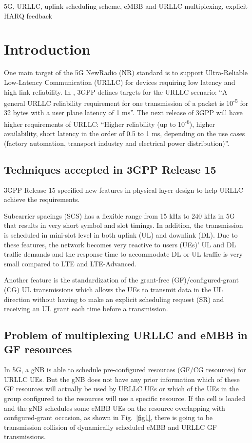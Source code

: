 \documentclass[conference]{IEEEtran}
\begin{document}
\begin{IEEEkeywords}
5G, URLLC, uplink scheduling scheme, eMBB and URLLC multiplexing, explicit HARQ feedback
\end{IEEEkeywords}

\section{Introduction} \label{I}
One main target of the 5G NewRadio (NR) standard is to support Ultra-Reliable Low-Latency Communication (URLLC) for devices requiring low latency and high link reliability. In \cite{b6}, 3GPP defines targets for the URLLC scenario: ``A general URLLC reliability requirement for one transmission of a packet is 10\textsuperscript{-5} for 32 bytes with a user plane latency of 1 ms''. The next release of 3GPP will have higher requirements of URLLC: ``Higher reliability (up to 10\textsuperscript{-6}), higher availability, short latency in the order of 0.5 to 1 ms, depending on the use cases (factory automation, transport industry and electrical power distribution)''\cite{b8}.

\subsection{Techniques accepted in 3GPP Release 15}\label{IAA}
3GPP Release 15 specified new features in physical layer design to help URLLC achieve the requirements.

Subcarrier spacings (SCS) has a flexible range from 15 kHz to 240 kHz in 5G that results in very short symbol and slot timings\cite{ad2}. In addition, the transmission is scheduled in  mini-slot level in both uplink (UL) and downlink (DL)\cite{ad3}. Due to these features, the network becomes very reactive to users (UEs)' UL and DL traffic demands and the response time to accommodate DL or UL traffic is very small compared to LTE and LTE-Advanced.

Another feature is the standardization of the grant-free (GF)/configured-grant (CG) UL transmissions which allows the UEs to transmit data in the UL direction without having to make an explicit scheduling request (SR) and receiving an UL grant each time before a transmission\cite{ad4}.

\subsection{Problem of multiplexing URLLC and eMBB in GF resources}\label{IBB}
In 5G, a gNB is able to schedule pre-configured resources (GF/CG resources) for URLLC UEs. But the gNB does not have any prior information which of these GF resources will actually be used by URLLC UEs or which of the UEs in the group configured to the resources will use a specific resource. If the cell is loaded and the gNB schedules some eMBB UEs on the resource overlapping with configured-grant occasion, as shown in Fig.~\ref{fig1}, there is going to be transmission collision of dynamically scheduled eMBB and URLLC GF transmissions. 
\end{document}
